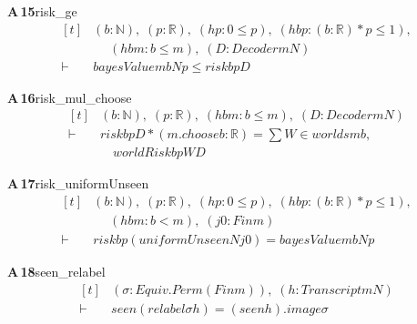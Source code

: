 \documentclass[conference]{IEEEtran}
\theoremstyle{definition}
\newcommand{\lean}[1]{\textsf{\footnotesize #1}}
\begin{document}
\noindent\textbf{A\,15}\quad\lean{risk\_ge}
{\footnotesize\[ \begin{aligned}[t]
&(\mathit{b} : \mathbb{N} ),\; (\mathit{p} : \mathbb{R} ),\; (\mathit{hp} : 0 \leq \mathit{p}),\; (\mathit{hbp} : (\mathit{b} : \mathbb{R} ) * \mathit{p} \leq 1),\\
&\quad \; (\mathit{hbm} : \mathit{b} \leq \mathit{m}),\; (\mathit{D} : \mathit{Decoder} \mathit{m} \mathit{N})\\
\vdash\;&\mathit{bayesValue} \mathit{m} \mathit{b} \mathit{N} \mathit{p} \leq \mathit{risk} \mathit{b} \mathit{p} \mathit{D}
\end{aligned} \]}

\noindent\textbf{A\,16}\quad\lean{risk\_mul\_choose}
{\footnotesize\[ \begin{aligned}[t]
&(\mathit{b} : \mathbb{N} ),\; (\mathit{p} : \mathbb{R} ),\; (\mathit{hbm} : \mathit{b} \leq \mathit{m}),\; (\mathit{D} : \mathit{Decoder} \mathit{m} \mathit{N})\\
\vdash\;&\mathit{risk} \mathit{b} \mathit{p} \mathit{D} * (\mathit{m}.\mathit{choose} \mathit{b} : \mathbb{R} ) = \textstyle\sum \mathit{W} \in \mathit{worlds} \mathit{m} \mathit{b},\\
&\quad \mathit{worldRisk} \mathit{b} \mathit{p} \mathit{W} \mathit{D}
\end{aligned} \]}

\noindent\textbf{A\,17}\quad\lean{risk\_uniformUnseen}
{\footnotesize\[ \begin{aligned}[t]
&(\mathit{b} : \mathbb{N} ),\; (\mathit{p} : \mathbb{R} ),\; (\mathit{hp} : 0 \leq \mathit{p}),\; (\mathit{hbp} : (\mathit{b} : \mathbb{R} ) * \mathit{p} \leq 1),\\
&\quad \; (\mathit{hbm} : \mathit{b} < \mathit{m}),\; (\mathit{j0} : \mathit{Fin} \mathit{m})\\
\vdash\;&\mathit{risk} \mathit{b} \mathit{p} (\mathit{uniformUnseen} \mathit{N} \mathit{j0}) = \mathit{bayesValue} \mathit{m} \mathit{b} \mathit{N} \mathit{p}
\end{aligned} \]}

\noindent\textbf{A\,18}\quad\lean{seen\_relabel}
{\footnotesize\[ \begin{aligned}[t]
&(\sigma : \mathit{Equiv}.\mathit{Perm} (\mathit{Fin} \mathit{m})),\; (\mathit{h} : \mathit{Transcript} \mathit{m} \mathit{N})\\
\vdash\;&\mathit{seen} (\mathit{relabel} \sigma \mathit{h}) = (\mathit{seen} \mathit{h}).\mathit{image} \sigma
\end{aligned} \]}
\end{document}

